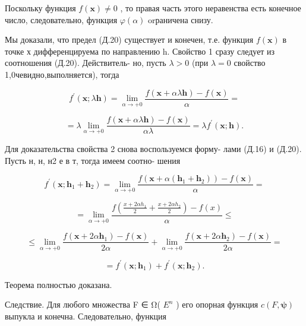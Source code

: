 \documentclass[8pt]{extarticle}
\begin{document}
Поскольку функция \(f\left( \mathbf{x}\right)  \neq  0\) , то правая часть этого неравенства есть конечное число, следовательно, функция \(\varphi \left( \alpha \right)\) orраничена снизу.

Мы доказали, что предел (Д.20) существует и конечен, т.е. функция \(f\left( \mathbf{x}\right)\) в точке х дифференцируема по направлению h. Свойство 1 сразу следует из соотношения (Д.20). Действитель- но, пусть \(\lambda  > 0\) (при \(\lambda  = 0\) свойство 1,0чевидно,выполняется), тогда

\[
{f}^{\prime }\left( {\mathbf{x};\lambda \mathbf{h}}\right)  = \mathop{\lim }\limits_{{\alpha  \rightarrow   + 0}}\frac{f\left( {\mathbf{x} + {\alpha \lambda }\mathbf{h}}\right)  - f\left( \mathbf{x}\right) }{\alpha } =
\]

\[
= \lambda \mathop{\lim }\limits_{{\alpha  \rightarrow   + 0}}\frac{f\left( {\mathbf{x} + {\alpha \lambda }\mathbf{h}}\right)  - f\left( \mathbf{x}\right) }{\alpha \lambda } = \lambda {f}^{\prime }\left( {\mathbf{x};\mathbf{h}}\right) .
\]

Для доказательства свойства 2 снова воспользуемся форму- лами (Д.16) и (Д.20). Пусть н, н, н2 е в т, тогда имеем соотно- шения

\[
{f}^{\prime }\left( {\mathbf{x};{\mathbf{h}}_{1} + {\mathbf{h}}_{2}}\right)  = \mathop{\lim }\limits_{{\alpha  \rightarrow   + 0}}\frac{f\left( {\mathbf{x} + \alpha \left( {{\mathbf{h}}_{1} + {\mathbf{h}}_{2}}\right) }\right)  - f\left( \mathbf{x}\right) }{\alpha } =
\]

\[
= \mathop{\lim }\limits_{{\alpha  \rightarrow   + 0}}\frac{f\left( {\frac{x + {2\alpha }{h}_{1}}{2} + \frac{x + {2\alpha }{h}_{2}}{2}}\right)  - f\left( x\right) }{\alpha } \leq
\]

\[
\leq  \mathop{\lim }\limits_{{\alpha  \rightarrow   + 0}}\frac{f\left( {\mathbf{x} + {2\alpha }{\mathbf{h}}_{1}}\right)  - f\left( \mathbf{x}\right) }{2\alpha } + \mathop{\lim }\limits_{{\alpha  \rightarrow   + 0}}\frac{f\left( {\mathbf{x} + {2\alpha }{\mathbf{h}}_{2}}\right)  - f\left( \mathbf{x}\right) }{2\alpha } =
\]

\[
= {f}^{\prime }\left( {\mathbf{x};{\mathbf{h}}_{1}}\right)  + {f}^{\prime }\left( {\mathbf{x};{\mathbf{h}}_{2}}\right) .
\]

Теорема полностью доказана.

Следствие. Для любого множества F ∈ Ω( \({E}^{n}\) ) его опорная функция \(c\left( {F,\mathbf{\psi }}\right)\) выпукла и конечна. Следовательно, функция
\end{document}
